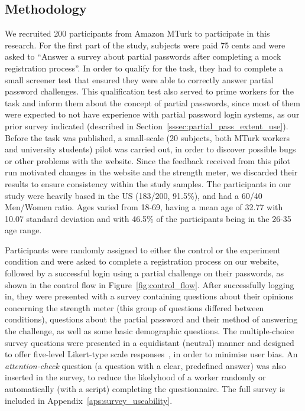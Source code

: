   \subsection{Methodology}
    \label{ssec:useability_setup}
    We recruited 200 participants from Amazon MTurk to participate in this research. For the first part of the study, subjects were paid 75 cents and were asked to ``Answer a survey about partial passwords after completing a mock registration process''. In order to qualify for the task, they had to complete a small screener test that ensured they were able to correctly answer partial password challenges. This qualification test also served to prime workers for the task and inform them about the concept of partial passwords, since most of them were expected to not have experience with partial password login systems, as our prior survey indicated (described in Section~\ref{sssec:partial_pass_extent_use}). Before the task was published, a small-scale (20 subjects, both MTurk workers and university students) pilot was carried out, in order to discover possible bugs or other problems with the website. Since the feedback received from this pilot run motivated changes in the website and the strength meter, we discarded their results to ensure consistency within the study samples. The participants in our study were heavily based in the US (183/200, 91.5\%), and had a 60/40 Men/Women ratio. Ages varied from 18-69, having a mean age of 32.77 with 10.07 standard deviation and with 46.5\% of the participants being in the 26-35 age range.

    Participants were randomly assigned to either the control or the experiment condition and were asked to complete a registration process on our website, followed by a successful login using a partial challenge on their passwords, as shown in the control flow in Figure~\ref{fig:control_flow}. After successfully logging in, they were presented with a survey containing questions about their opinions concerning the strength meter (this group of questions differed between conditions), questions about the partial password and their method of answering the challenge, as well as some basic demographic questions. The multiple-choice survey questions were presented in a equidistant (neutral) manner and designed to offer five-level Likert-type scale responses~\cite{likert}, in order to minimise user bias. An \emph{attention-check} question (a question with a clear, predefined answer) was also inserted in the survey, to reduce the likelyhood of a worker randomly or automatically (with a script) completing the questionnaire. The full survey is included in Appendix~\ref{aps:survey_useability}.

